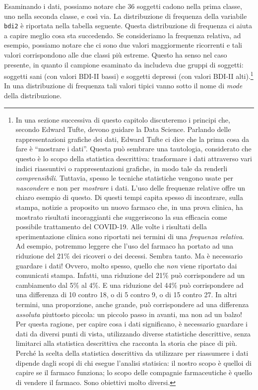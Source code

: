 \documentclass[
  10pt,
  italian,
  a4paper,
  extrafontsizes,onecolumn,openright
  ]{memoir}
\theoremstyle{definition}
\theoremstyle{definition}
\theoremstyle{definition}
\theoremstyle{definition}
\theoremstyle{remark}
\begin{document}
Esaminando i dati, possiamo notare che 36 soggetti cadono nella prima classe, uno nella seconda classe, e così via. La distribuzione di frequenza della variabile \texttt{bdi2} è riportata nella tabella seguente. Questa distribuzione di frequenza ci aiuta a capire meglio cosa sta succedendo. Se consideriamo la frequenza relativa, ad esempio, possiamo notare che ci sono due valori maggiormente ricorrenti e tali valori corrispondono alle due classi più estreme. Questo ha senso nel caso presente, in quanto il campione esaminato da \textcite{zetschefuture2019} includeva due gruppi di soggetti: soggetti sani (con valori BDI-II bassi) e soggetti depressi (con valori BDI-II alti).\footnote{In una sezione successiva di questo capitolo discuteremo i principi che, secondo Edward Tufte, devono guidare la Data Science. Parlando delle rappresentazioni grafiche dei dati, Edward Tufte ci dice che la prima cosa da fare è ``mostrare i dati''. Questa può sembrare una tautologia, considerato che questo è lo scopo della statistica descrittiva: trasformare i dati attraverso vari indici riassuntivi o rappresentazioni grafiche, in modo tale da renderli \emph{comprensibili}. Tuttavia, spesso le tecniche statistiche vengono usate per \emph{nascondere} e non per \emph{mostrare} i dati. L'uso delle frequenze relative offre un chiaro esempio di questo. Di questi tempi capita spesso di incontrare, sulla stampa, notizie a proposito un nuovo farmaco che, in una prova clinica, ha mostrato risultati incoraggianti che suggeriscono la sua efficacia come possibile trattamento del COVID-19. Alle volte i risultati della sperimentazione clinica sono riportati nei termini di una \emph{frequenza relativa}. Ad esempio, potremmo leggere che l'uso del farmaco ha portato ad una riduzione del 21\% dei ricoveri o dei decessi. Sembra tanto. Ma è necessario guardare i dati! Ovvero, molto spesso, quello che \emph{non} viene riportato dai comunicati stampa. Infatti, una riduzione del 21\% può corrispondere ad un cambiamento dal 5\% al 4\%. E una riduzione del 44\% può corrispondere ad una differenza di 10 contro 18, o di 5 contro 9, o di 15 contro 27. In altri termini, una proporzione, anche grande, può corrispondere ad una differenza \emph{assoluta} piuttosto piccola: un piccolo passo in avanti, ma non ad un balzo! Per questa ragione, per capire cosa i dati significano, è necessario guardare i dati da diversi punti di vista, utilizzando diverse statistiche descrittive, senza limitarci alla statistica descrittiva che racconta la storia che piace di più. Perché la scelta della statistica descrittiva da utilizzare per riassumere i dati dipende dagli scopi di chi esegue l'analisi statisica: il nostro scopo è quelloi di capire se il farmaco funziona; lo scopo delle compagnie farmaceutiche è quello di vendere il farmaco. Sono obiettivi molto diversi.} In una distribuzione di frequenza tali valori tipici vanno sotto il nome di \emph{mode} della distribuzione.
\end{document}
